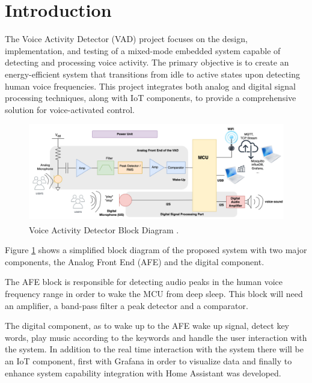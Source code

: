 \section{Introduction}

The Voice Activity Detector (VAD) project focuses on the design, implementation, and testing of a mixed-mode embedded system capable of detecting and processing voice activity. The primary objective is to create an energy-efficient system that transitions from idle to active states upon detecting human voice frequencies. This project integrates both analog and digital signal processing techniques, along with IoT components, to provide a comprehensive solution for voice-activated control.

\begin{figure}[H]
    \centering
    \includegraphics*[scale = 0.3]{Images/VADBlockDiagram.png}
    \caption{Voice Activity Detector Block Diagram \textsuperscript{\cite{Lab-statement}} .}
    \label{fig:VADBlockDiagram}
\end{figure}

Figure \ref{fig:VADBlockDiagram} shows a simplified block diagram of the proposed system with two major components, the Analog Front End (AFE) and the digital component.

The AFE block is responsible for detecting audio peaks in the human voice frequency range in order to wake the MCU from deep sleep. This block will need an amplifier, a band-pass filter a peak detector and a comparator. 

The digital component, as to wake up to the AFE wake up signal, detect key words, play music according to the keywords and handle the user interaction with the system. In addition to the real time interaction with the system there will be an IoT component, first with Grafana in order to visualize data and finally to enhance system capability integration with Home Assistant was developed.